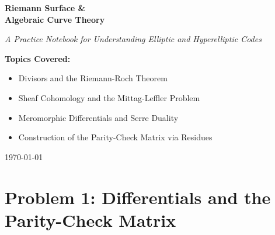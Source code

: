 \documentclass[11pt, a4paper, twoside]{article}
\begin{document}
	
	\begin{titlepage}
		\centering
		\vspace*{2in}
		
		{\Huge \bfseries Riemann Surface \& \\ Algebraic Curve Theory \par}
		\vspace{0.5in}
		{\Large \textit{A Practice Notebook for Understanding Elliptic and Hyperelliptic Codes} \par}
		
		\vspace{1.5in}
		
		{\large \textbf{Topics Covered:} \par}
		\vspace{0.2in}
		\begin{itemize}
			\item Divisors and the Riemann-Roch Theorem
			\item Sheaf Cohomology and the Mittag-Leffler Problem
			\item Meromorphic Differentials and Serre Duality
			\item Construction of the Parity-Check Matrix via Residues
		\end{itemize}
		
		\vfill
		
		{\large \today \par}
	\end{titlepage}
	
	\newpage
	
	\section*{Problem 1: Differentials and the Parity-Check Matrix}
	
\end{document}
